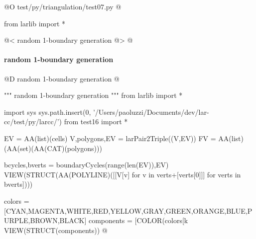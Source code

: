 \documentclass[11pt,oneside]{article}    %
\begin{document}
@O test/py/triangulation/test07.py
@{
from larlib import *

@< random 1-boundary generation @>
@}

\paragraph{random 1-boundary generation}

@D random 1-boundary generation
@{""" random 1-boundary generation """
from larlib import *

import sys
sys.path.insert(0, '/Users/paoluzzi/Documents/dev/lar-cc/test/py/larcc/')
from test16 import *

EV = AA(list)(cells)
V,polygons,EV = larPair2Triple((V,EV))
FV = AA(list)(AA(set)(AA(CAT)(polygons)))

bcycles,bverts = boundaryCycles(range(len(EV)),EV)
VIEW(STRUCT(AA(POLYLINE)([[V[v] for v in verts+[verts[0]]] for verts in bverts])))

colors = [CYAN,MAGENTA,WHITE,RED,YELLOW,GRAY,GREEN,ORANGE,BLUE,PURPLE,BROWN,BLACK]
components = [COLOR(colors[k%
VIEW(STRUCT(components))
@}








\end{document}
